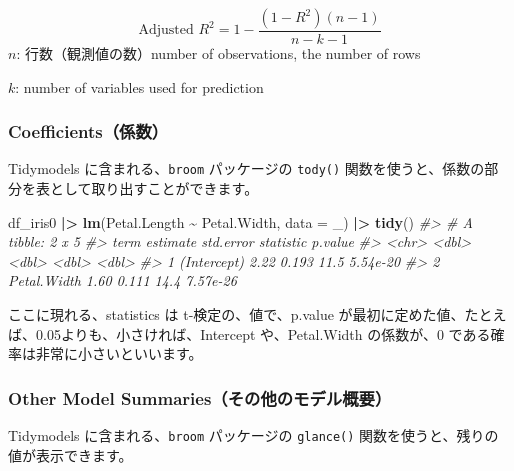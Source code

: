 \documentclass[
  xelatex, ja=standard]{bxjsbook}
\newenvironment{Shaded}{\begin{snugshade}}{\end{snugshade}}
\newcommand{\AttributeTok}[1]{\textcolor[rgb]{0.13,0.29,0.53}{#1}}
\newcommand{\CommentTok}[1]{\textcolor[rgb]{0.56,0.35,0.01}{\textit{#1}}}
\newcommand{\FunctionTok}[1]{\textcolor[rgb]{0.13,0.29,0.53}{\textbf{#1}}}
\newcommand{\NormalTok}[1]{#1}
\newcommand{\SpecialCharTok}[1]{\textcolor[rgb]{0.81,0.36,0.00}{\textbf{#1}}}
\theoremstyle{definition}
\theoremstyle{definition}
\theoremstyle{definition}
\theoremstyle{definition}
\theoremstyle{remark}
\begin{document}
\[\text{Adjusted }R^2 = 1- \frac{(1-R^2)(n-1)}{n-k-1}\] \(n\): 行数（観測値の数）number of observations, the number of rows

\(k\): number of variables used for prediction

\hypertarget{coefficientsux4fc2ux6570}{%
\subsubsection{Coefficients（係数）}\label{coefficientsux4fc2ux6570}}

Tidymodels に含まれる、\texttt{broom} パッケージの \texttt{tody()} 関数を使うと、係数の部分を表として取り出すことができます。

\begin{Shaded}
\begin{Highlighting}[]
\NormalTok{df\_iris0 }\SpecialCharTok{|\textgreater{}} \FunctionTok{lm}\NormalTok{(Petal.Length }\SpecialCharTok{\textasciitilde{}}\NormalTok{ Petal.Width, }\AttributeTok{data =}\NormalTok{ \_) }\SpecialCharTok{|\textgreater{}} \FunctionTok{tidy}\NormalTok{()}
\CommentTok{\#\textgreater{} \# A tibble: 2 x 5}
\CommentTok{\#\textgreater{}   term        estimate std.error statistic  p.value}
\CommentTok{\#\textgreater{}   \textless{}chr\textgreater{}          \textless{}dbl\textgreater{}     \textless{}dbl\textgreater{}     \textless{}dbl\textgreater{}    \textless{}dbl\textgreater{}}
\CommentTok{\#\textgreater{} 1 (Intercept)     2.22     0.193      11.5 5.54e{-}20}
\CommentTok{\#\textgreater{} 2 Petal.Width     1.60     0.111      14.4 7.57e{-}26}
\end{Highlighting}
\end{Shaded}

ここに現れる、statistics は t-検定の、値で、p.value が最初に定めた値、たとえば、0.05よりも、小さければ、Intercept や、Petal.Width の係数が、0 である確率は非常に小さいといいます。

\hypertarget{other-model-summariesux305dux306eux4ed6ux306eux30e2ux30c7ux30ebux6982ux8981}{%
\subsubsection{Other Model Summaries（その他のモデル概要）}\label{other-model-summariesux305dux306eux4ed6ux306eux30e2ux30c7ux30ebux6982ux8981}}

Tidymodels に含まれる、\texttt{broom} パッケージの \texttt{glance()} 関数を使うと、残りの値が表示できます。
\end{document}
